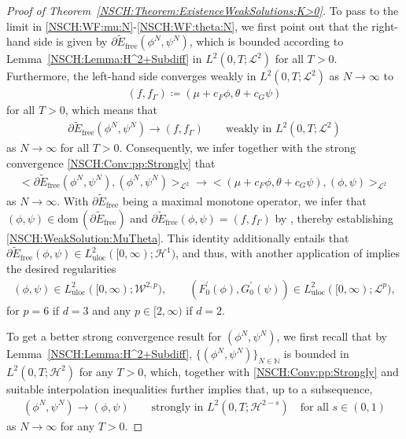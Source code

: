 \documentclass[11pt,reqno]{amsart}
\theoremstyle{remark}
\numberwithin{equation}{section}
\newcommand{\bigang}[2]{ \big< #1 , #2  \big>}
\newcommand{\N}{\mathbb N}
\newcommand{\Ga}{\Gamma}
\newcommand{\free}{\mathrm{free}}
\begin{document}
\begin{proof}[Proof of Theorem~\ref{NSCH:Theorem:ExistenceWeakSolutions:K>0}]
    To pass to the limit in \eqref{NSCH:WF:mu:N}-\eqref{NSCH:WF:theta:N}, we first point out that the right-hand side is given by $\partial \widetilde E_\free(\phi^N,\psi^N)$, which is bounded according to Lemma~\ref{NSCH:Lemma:H^2+Subdiff} in $L^2(0,T;\mathcal{L}^2)$ for all $T > 0$. Furthermore, the left-hand side converges weakly in $L^2(0,T;\mathcal{L}^2)$ as $N\rightarrow\infty$ to
    \begin{align*}
        (f,f_\Ga) \coloneqq (\mu + c_F\phi, \theta + c_G\psi)
    \end{align*}
    for all $T > 0$, which means that 
    \begin{align*}
        \partial \widetilde E_\free(\phi^N,\psi^N) \rightarrow (f,f_\Ga) \qquad\text{weakly in~} L^2(0,T;\mathcal{L}^2)
    \end{align*}
    as $N\rightarrow\infty$ for all $T > 0$.
    Consequently, we infer together with the strong convergence \eqref{NSCH:Conv:pp:Strongly} that
    \begin{align*}
        \bigang{\partial \widetilde E_\free(\phi^N,\psi^N)}{(\phi^N,\psi^N)}_{\mathcal{L}^2} \rightarrow \bigang{(\mu + c_F\phi,\theta + c_G\psi)}{(\phi,\psi)}_{\mathcal{L}^2}
    \end{align*}
    as $N\rightarrow\infty$. With $\partial\widetilde E_\free$ being a maximal monotone operator, we infer that $(\phi,\psi)\in\mathrm{dom}\,(\partial\widetilde E_\free)$ and $\partial\widetilde E_\free(\phi,\psi) = (f,f_\Ga)$ by \cite[Proposition~2.1]{Barbu2010}, thereby establishing \eqref{NSCH:WeakSolution:MuTheta}. This identity additionally entails that $\partial\widetilde E_\free(\phi,\psi)\in L^2_{\mathrm{uloc}}([0,\infty);\mathcal{H}^1)$, and thus, with another application of \cite[Proposition~5.1]{Giorgini2026} implies the desired regularities
    \begin{align*}
    	(\phi,\psi)\in L^2_{\mathrm{uloc}}([0,\infty);\mathcal{W}^{2,p}), \qquad (F_0^\prime(\phi),G_0^\prime(\psi))\in L^2_{\mathrm{uloc}}([0,\infty);\mathcal{L}^p),
    \end{align*}
    for $p = 6$ if $d = 3$ and any $p\in[2,\infty)$ if $d = 2$.
    
    To get a better strong convergence result for $(\phi^N,\psi^N)$,
    we first recall that by Lemma~\ref{NSCH:Lemma:H^2+Subdiff}, $\{(\phi^N,\psi^N)\}_{N\in\N}$ is bounded in $L^2(0,T;\mathcal{H}^2)$ for any $T > 0$, which, together with \eqref{NSCH:Conv:pp:Strongly} and suitable interpolation inequalities further implies that, up to a subsequence,
    \begin{align}\label{NSCH:Conv:pp:Strong:H2-s}
    	(\phi^N,\psi^N) \rightarrow (\phi,\psi) \qquad\text{strongly in~} L^2(0,T;\mathcal{H}^{2-s}) \quad\text{for all~}s\in(0,1)
    \end{align}
    as $N\rightarrow\infty$ for any $T > 0$.
    

\end{proof}
\end{document}
